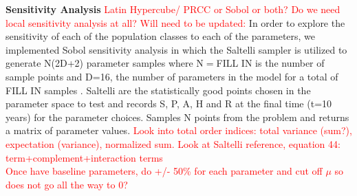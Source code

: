 \documentclass[12pt]{article}
\begin{document}









\textbf{Sensitivity Analysis} 
\textcolor{red}{Latin Hypercube/ PRCC or Sobol or both? Do we need local sensitivity analysis at all?} 
\textcolor{red}{Will need to be updated:} In order to explore the sensitivity of each of the population classes to each of the parameters, we implemented Sobol sensitivity analysis in which the Saltelli sampler is utilized to generate N(2D+2) parameter samples where N$=$FILL IN is the number of sample points and D=16, the number of parameters in the model for a total of FILL IN samples \cite{Herman}. 
Saltelli are the statistically good points chosen in the parameter space to test and records S, P, A, H and R at the final time (t=10 years) for the parameter choices. Samples N points from the problem and returns a matrix of parameter values. 
\textcolor{red}{Look into total order indices: total variance (sum?), expectation (variance), normalized sum. Look at Saltelli reference, equation 44: term+complement+interaction terms} \\
\textcolor{red}{Once have baseline parameters, do +/- 50\% for each parameter and cut off $\mu$ so does not go all the way to 0?}
\end{document}
